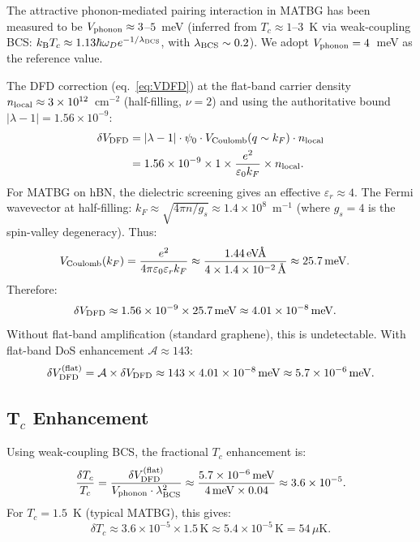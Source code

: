 \documentclass[11pt]{article}
\newcommand{\ee}[1]{\times 10^{#1}}
\newcommand{\kB}{k_{\rm B}}
\newcommand{\nuFill}{\nu}
\newcommand{\VDFD}{\delta V_{\rm DFD}}
\newcommand{\lambdabound}{1.56\ee{-9}}
\begin{document}
The attractive phonon-mediated pairing interaction in MATBG has been
measured to be $V_{\rm phonon} \approx 3$--$5$~meV (inferred from
$T_c \approx 1$--$3$~K via weak-coupling BCS: $\kB T_c \approx 1.13
\hbar\omega_D e^{-1/\lambda_{\rm BCS}}$, with $\lambda_{\rm BCS} \sim 0.2$).
We adopt $V_{\rm phonon} = 4$~meV as the reference value.

The DFD correction (eq.~\ref{eq:VDFD}) at the flat-band carrier density
$n_{\rm local} \approx 3\ee{12}$~cm$^{-2}$ (half-filling, $\nuFill = 2$)
and using the authoritative bound $|\lambda-1| = \lambdabound$:
\begin{align}
  \VDFD &= |\lambda-1| \cdot \psi_0 \cdot V_{\rm Coulomb}(q \sim k_F)
            \cdot n_{\rm local} \nonumber\\
        &= \lambdabound \times 1 \times
           \frac{e^2}{\varepsilon_0 k_F} \times n_{\rm local}.
  \label{eq:VDFD_estimate}
\end{align}
For MATBG on hBN, the dielectric screening gives an effective
$\varepsilon_r \approx 4$. The Fermi wavevector at half-filling:
$k_F \approx \sqrt{4\pi n / g_s} \approx 1.4\ee{8}$~m$^{-1}$ (where
$g_s = 4$ is the spin-valley degeneracy). Thus:
\begin{align}
  V_{\rm Coulomb}(k_F) &= \frac{e^2}{4\pi\varepsilon_0\varepsilon_r k_F}
    \approx \frac{1.44\,\text{eV\AA}}{4 \times 1.4\ee{-2}\,\text{\AA}}
    \approx 25.7\,\text{meV}.
  \label{eq:VCoulomb}
\end{align}
Therefore:
\begin{align}
  \VDFD &\approx 1.56\ee{-9} \times 25.7\,\text{meV}
    \approx 4.01\ee{-8}\,\text{meV}.
  \label{eq:VDFD_value}
\end{align}
Without flat-band amplification (standard graphene), this is undetectable.
With flat-band DoS enhancement $\mathcal{A} \approx 143$:
\begin{equation}
  \VDFD^{\rm (flat)} = \mathcal{A} \times \VDFD
    \approx 143 \times 4.01\ee{-8}\,\text{meV}
    \approx 5.7\ee{-6}\,\text{meV}.
  \label{eq:VDFD_flat}
\end{equation}

\subsection{T$_c$ Enhancement}

Using weak-coupling BCS, the fractional $T_c$ enhancement is:
\begin{equation}
  \frac{\delta T_c}{T_c} = \frac{\delta V_{\rm DFD}^{\rm (flat)}}
    {V_{\rm phonon} \cdot \lambda_{\rm BCS}^2}
    \approx \frac{5.7\ee{-6}\,\text{meV}}{4\,\text{meV} \times 0.04}
    \approx 3.6\ee{-5}.
  \label{eq:dTc}
\end{equation}
For $T_c = 1.5$~K (typical MATBG), this gives:
\begin{equation}
  \delta T_c \approx 3.6\ee{-5} \times 1.5\,\text{K}
    \approx 5.4\ee{-5}\,\text{K} = 54\,\mu\text{K}.
  \label{eq:dTc_value}
\end{equation}
\end{document}
